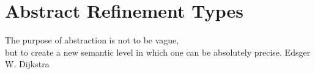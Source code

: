 \chapter{Abstract Refinement Types}\label{chapter:abstractrefinements}
\makequote
{The purpose of abstraction is not to be vague,\\
but to create a new semantic level in which one can be absolutely precise.}
{Edsger W. Dijkstra}


\renewcommand{\reft}{\ensuremath{e}\xspace}
\renewcommand\tref[2]{\ensuremath{\left\lbrace \vref : #1\mid #2\right\rbrace}}
\renewcommand\tref[2]{\ensuremath{\left\lbrace \vref : #1\mid #2\right\rbrace}}

\renewcommand\subt{\preceq}
\renewcommand\corelan{$\lambda_\downarrow$\xspace}
\renewcommand\sub[2]{\ensuremath{ \left[ #1 \mapsto #2 \right] }}
\renewcommand\shape{\ensuremath{\text{shape}}\xspace}
\renewcommand\tfun[3]{\ensuremath{{(#1:#2)} \rightarrow #3}}


\renewcommand\ecase[5]{\ensuremath{
	\mathtt{case}\ #5 = #1\ \mathtt{of}\ \{ #2\ #3 \rightarrow #4\}
}}

\renewcommand\corelan{$\lambda_{P}$\xspace}







